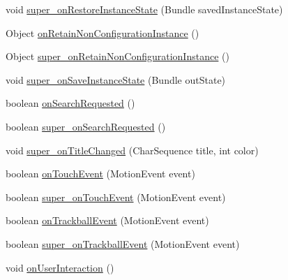 \begin{DoxyCompactItemize}
\item 
void \hyperlink{classorg_1_1qtproject_1_1qt5_1_1android_1_1bindings_1_1_qt_activity_a73303f1db92072963fe8592eb05b0258}{super\+\_\+on\+Restore\+Instance\+State} (Bundle saved\+Instance\+State)
\item 
Object \hyperlink{classorg_1_1qtproject_1_1qt5_1_1android_1_1bindings_1_1_qt_activity_a5954d45f88dd09deba757e671de9077d}{on\+Retain\+Non\+Configuration\+Instance} ()
\item 
Object \hyperlink{classorg_1_1qtproject_1_1qt5_1_1android_1_1bindings_1_1_qt_activity_a4fa6ba75523273de5b492052f1ae06f0}{super\+\_\+on\+Retain\+Non\+Configuration\+Instance} ()
\item 
void \hyperlink{classorg_1_1qtproject_1_1qt5_1_1android_1_1bindings_1_1_qt_activity_a8fb26c42bd8d7516bf863cc5fb50e287}{super\+\_\+on\+Save\+Instance\+State} (Bundle out\+State)
\item 
boolean \hyperlink{classorg_1_1qtproject_1_1qt5_1_1android_1_1bindings_1_1_qt_activity_aa1c033b0b0bbc4cb9c193b239992fcb8}{on\+Search\+Requested} ()
\item 
boolean \hyperlink{classorg_1_1qtproject_1_1qt5_1_1android_1_1bindings_1_1_qt_activity_a41f90d68a12b8140f7b0f4c4037c2567}{super\+\_\+on\+Search\+Requested} ()
\item 
void \hyperlink{classorg_1_1qtproject_1_1qt5_1_1android_1_1bindings_1_1_qt_activity_aa3982942fa042ca69a13ffbaff0ef403}{super\+\_\+on\+Title\+Changed} (Char\+Sequence title, int color)
\item 
boolean \hyperlink{classorg_1_1qtproject_1_1qt5_1_1android_1_1bindings_1_1_qt_activity_ada200302a153c7dbab3e55b746a7a179}{on\+Touch\+Event} (Motion\+Event event)
\item 
boolean \hyperlink{classorg_1_1qtproject_1_1qt5_1_1android_1_1bindings_1_1_qt_activity_a216ec445b2cc31beac2032e38dd5e949}{super\+\_\+on\+Touch\+Event} (Motion\+Event event)
\item 
boolean \hyperlink{classorg_1_1qtproject_1_1qt5_1_1android_1_1bindings_1_1_qt_activity_a27faf58c38193faea2782ff85cedb567}{on\+Trackball\+Event} (Motion\+Event event)
\item 
boolean \hyperlink{classorg_1_1qtproject_1_1qt5_1_1android_1_1bindings_1_1_qt_activity_a4ee363f63dfde917e450b70c8880fef9}{super\+\_\+on\+Trackball\+Event} (Motion\+Event event)
\item 
void \hyperlink{classorg_1_1qtproject_1_1qt5_1_1android_1_1bindings_1_1_qt_activity_a3917d7d3ac6ab5bf31444d31b2784828}{on\+User\+Interaction} ()
\item 

\end{DoxyCompactItemize}
